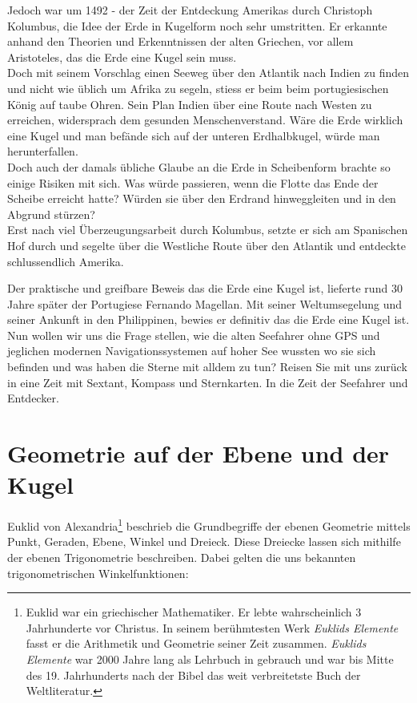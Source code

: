 \begin{refsection}
Jedoch war um 1492 - der Zeit der Entdeckung Amerikas durch Christoph Kolumbus, die Idee der Erde in Kugelform noch sehr umstritten. Er erkannte anhand den Theorien und Erkenntnissen der alten Griechen, vor allem Aristoteles, das die Erde eine Kugel sein muss. \\
Doch mit seinem Vorschlag einen Seeweg über den Atlantik nach Indien zu finden und nicht wie üblich um Afrika zu segeln, stiess er beim beim portugiesischen König auf taube Ohren. Sein Plan Indien über eine Route nach Westen zu erreichen, widersprach dem gesunden Menschenverstand. Wäre die Erde wirklich eine Kugel und man befände sich auf der unteren Erdhalbkugel, würde man herunterfallen.\\
Doch auch der damals übliche Glaube an die Erde in Scheibenform brachte so einige Risiken mit sich. Was würde passieren, wenn die Flotte das Ende der Scheibe erreicht hatte? Würden sie über den Erdrand hinweggleiten und in den Abgrund stürzen?\\
Erst nach viel Überzeugungsarbeit durch Kolumbus, setzte er sich am Spanischen Hof durch und segelte über die Westliche Route über den Atlantik und entdeckte schlussendlich Amerika.

Der praktische und greifbare Beweis das die Erde eine Kugel ist, lieferte rund 30 Jahre später der Portugiese Fernando Magellan. Mit seiner Weltumsegelung und seiner Ankunft in den Philippinen, bewies er definitiv das die Erde eine Kugel ist.\\

Nun wollen wir uns die Frage stellen, wie die alten Seefahrer ohne GPS und jeglichen modernen Navigationssystemen auf hoher See wussten wo sie sich befinden und was haben die Sterne mit alldem zu tun? Reisen Sie mit uns zurück in eine Zeit mit Sextant, Kompass und Sternkarten. In die Zeit der Seefahrer und Entdecker.


\section{Geometrie auf der Ebene und der Kugel}

Euklid von Alexandria\footnote{%
Euklid war ein griechischer Mathematiker. Er lebte wahrscheinlich 3 Jahrhunderte vor Christus. In seinem berühmtesten Werk \textit{Euklids Elemente} fasst er die Arithmetik und Geometrie seiner Zeit zusammen. \textit{Euklids Elemente} war 2000 Jahre lang als Lehrbuch in gebrauch und war bis Mitte des 19. Jahrhunderts nach der Bibel das weit verbreitetste Buch der Weltliteratur.}  beschrieb die Grundbegriffe der ebenen Geometrie mittels Punkt, Geraden, Ebene, Winkel und Dreieck. Diese Dreiecke lassen sich mithilfe der ebenen Trigonometrie beschreiben. Dabei gelten die uns bekannten trigonometrischen Winkelfunktionen:\\


\end{refsection}
